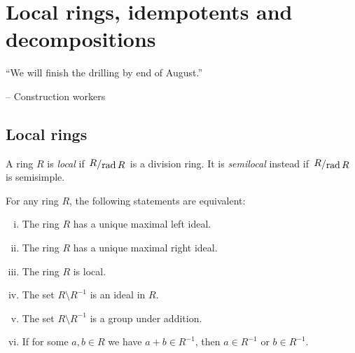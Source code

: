 \section{Local rings, idempotents and decompositions}

\epigraph{``We will finish the drilling by end of
August.''}{-- Construction workers}

\subsection{Local rings}

\begin{definicija}
A ring $R$ is \emph{local} if $\kvoc{R}{\rad R}$
is a division ring. It is \emph{semilocal}
instead if $\kvoc{R}{\rad R}$ is semisimple.
\end{definicija}

\begin{izrek}
For any ring $R$, the following statements are equivalent:

\begin{enumerate}[i)]
\item The ring $R$ has a unique maximal left ideal.
\item The ring $R$ has a unique maximal right ideal.
\item The ring $R$ is local.
\item The set $R \setminus R^{-1}$ is an ideal in $R$.
\item The set $R \setminus R^{-1}$ is a group under addition.
\item If for some $a, b \in R$ we have $a + b \in R^{-1}$, then
$a \in R^{-1}$ or $b \in R^{-1}$.
\end{enumerate}
\end{izrek}

